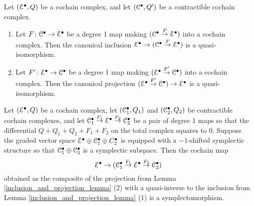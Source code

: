 \documentclass[10pt, oneside]{article}
\begin{document}
 

\begin{lemma} \label{inclusion_and_projection_lemma}
Let $(\mathcal{E}^\bullet, Q)$ be a cochain complex, and let $(\mathcal{C}^\bullet, Q')$ be a contractible cochain complex.
\begin{enumerate}
 \item Let $F \colon \mathcal{C}^\bullet \to \mathcal{E}^\bullet$ be a degree 1 map making $(\mathcal{C}^\bullet \overset F\to \mathcal{E}^\bullet)$ into a cochain complex.  Then the canonical inclusion $\mathcal{E}^\bullet \to (\mathcal{C}^\bullet \overset F\to \mathcal{E}^\bullet)$ is a quasi-isomorphism.
 \item Let $F' \colon \mathcal{E}^\bullet \to \mathcal{C}^\bullet$ be a degree 1 map making $(\mathcal{E}^\bullet \overset {F'}\to \mathcal{C}^\bullet)$ into a cochain complex.  Then the canonical projection $(\mathcal{E}^\bullet \overset {F'}\to \mathcal{C}^\bullet) \to \mathcal{E}^\bullet$ is a quasi-isomorphism.
\end{enumerate}
\end{lemma}

\begin{lemma} \label{symplectic_composite_lemma}
Let $(\mathcal{E}^\bullet,Q)$ be a cochain complex, let $(\mathcal{C}_1^\bullet, Q_1)$ and $(\mathcal{C}_2^\bullet, Q_2)$ be contractible cochain complexes, and let $\mathcal{C}_1^\bullet \overset{F_1}\to \mathcal{E}^\bullet \overset{F_2}\to \mathcal{C}_2^\bullet$ be a pair of degree 1 maps so that the differential $Q + Q_1 + Q_2 + F_1 + F_2$ on the total complex squares to 0.  Suppose the graded vector space $\mathcal{E}^\bullet \oplus \mathcal{C}_1^\bullet \oplus C_2^\bullet$ is equipped with a $-1$-shifted symplectic structure so that $\mathcal{C}_1^\bullet \oplus \mathcal{C}_2^\bullet$ is a symplectic subspace.  Then the cochain map 
\begin{equation}
\label{symp_composite_eqn}\mathcal{E}^\bullet \to (\mathcal{C}_1^\bullet \overset{F_1}\to \mathcal{E}^\bullet \overset{F_2}\to \mathcal{C}_2^\bullet)
\end{equation}
obtained as the composite of the projection from Lemma \ref{inclusion_and_projection_lemma} (2) with a quasi-inverse to the inclusion from Lemma \ref{inclusion_and_projection_lemma} (1) is a symplectomorphism.
\end{lemma}
\end{document}
